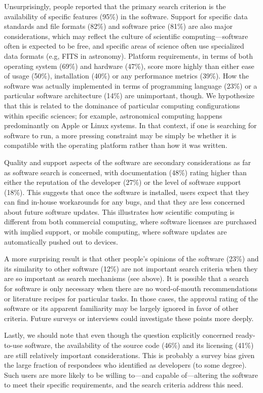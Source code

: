 \documentclass{casicswhitepaper}
\begin{document}
Unsurprisingly, people reported that the primary search criterion is the availability of specific features (95\%) in the software. Support for specific data standards and file formats (82\%) and software price (81\%) are also major considerations, which may reflect the culture of scientific computing---software often is expected to be free, and specific areas of science often use specialized data formats (e.g, FITS in astronomy). Platform requirements, in terms of both operating system (69\%) and hardware (47\%), score more highly than either ease of usage (50\%), installation (40\%) or any performance metrics (39\%). How the software was actually implemented in terms of programming language (23\%) or a particular software architecture (14\%) are unimportant, though.  We hypothesize that this is related to the dominance of particular computing configurations within specific sciences; for example, astronomical computing happens predominantly on Apple or Linux systems.  In that context, if one is searching for software to run, a more pressing constraint may be simply be whether it is compatible with the operating platform rather than how it was written.

Quality and support aspects of the software are secondary considerations as far as software search is concerned, with documentation (48\%) rating higher than either the reputation of the developer (27\%) or the level of software support (18\%). This suggests that once the software is installed, users expect that they can find in-house workarounds for any bugs, and that they are less concerned about future software updates. This illustrates how scientific computing is different from both commercial computing, where software licenses are purchased with implied support, or mobile computing, where software updates are automatically pushed out to devices.

A more surprising result is that other people's opinions of the software (23\%) and its similarity to other software (12\%) are not important search criteria when they are so important as search mechanisms (see above). It is possible that a search for software is only necessary when there are no word-of-mouth recommendations or literature recipes for particular tasks. In those cases, the approval rating of the software or its apparent familiarity may be largely ignored in favor of other criteria.  Future surveys or interviews could investigate these points more deeply.

Lastly, we should note that even though the question explicitly concerned ready-to-use software, the availability of the source code (46\%) and its licensing (41\%) are still relatively important considerations. This is probably a survey bias given the large fraction of respondees who identified as developers (to some degree). Such users are more likely to be willing to---and capable of---altering the software to meet their specific requirements, and the search criteria address this need.
\end{document}
